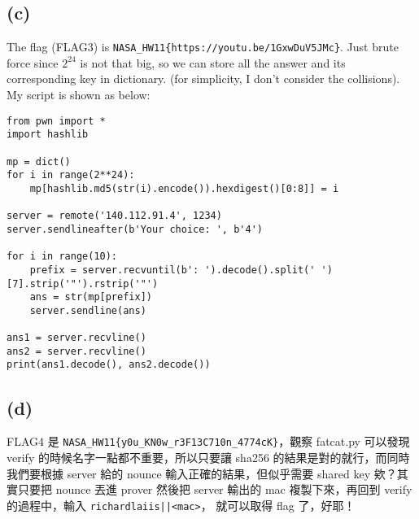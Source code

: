 \documentclass[12pt]{article}
\begin{document}
\subsection*{(c)}
The flag (FLAG3) is \verb|NASA_HW11{https://youtu.be/1GxwDuV5JMc}|. Just brute force since $2^{24}$ is not that big, so we can store all the answer and its corresponding key in dictionary. (for simplicity, I don't consider the collisions). My script is shown as below:
\begin{verbatim}
from pwn import *
import hashlib

mp = dict()
for i in range(2**24):
    mp[hashlib.md5(str(i).encode()).hexdigest()[0:8]] = i

server = remote('140.112.91.4', 1234)
server.sendlineafter(b'Your choice: ', b'4')

for i in range(10):
    prefix = server.recvuntil(b': ').decode().split(' ')[7].strip('"').rstrip('"')
    ans = str(mp[prefix])
    server.sendline(ans)

ans1 = server.recvline()
ans2 = server.recvline()
print(ans1.decode(), ans2.decode())
\end{verbatim}
\subsection*{(d)}
FLAG4 是 \verb|NASA_HW11{y0u_KN0w_r3F13C710n_4774cK}|，觀察 fatcat.py 可以發現 verify 的時候名字一點都不重要，所以只要讓 sha256 的結果是對的就行，而同時我們要根據 server 給的 nounce 輸入正確的結果，但似乎需要 shared key 欸？其實只要把 nounce 丟進 prover 然後把 server 輸出的 mac 複製下來，再回到 verify 的過程中，輸入 \texttt{richardlaiis||<mac>}， 就可以取得 flag 了，好耶！
\end{document}

